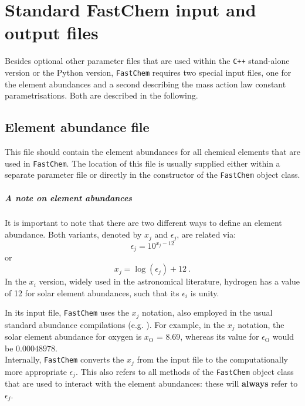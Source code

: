 \documentclass[numbers=noenddot]{aux/fcmanual}
\newcommand{\fc}{\texttt{FastChem}\xspace}
\newcommand{\cpp}{\ttt{C++}\xspace}
\newcommand{\ttt}[1]{\texttt {#1}}
\begin{document}
\chapter{Standard FastChem input and output files}
\label{sec:fastchem_input_files}

Besides optional other parameter files that are used within the \cpp stand-alone version or the Python version, \fc requires two special input files, one for the element abundances and a second describing the mass action law constant parametrisations. Both are described in the following.

\section{Element abundance file}

This file should contain the element abundances for all chemical elements that are used in \fc. The location of this file is usually supplied either within a separate parameter file or directly in the constructor of the \fc object class.

\paragraph{A note on element abundances}
It is important to note that there are two different ways to define an element abundance. Both variants, denoted by $x_j$ and $\epsilon_j$, are related via:
\begin{equation}
\epsilon_j = 10^{x_j - 12}
\end{equation}
or
\begin{equation}
 x_j = \log\left(\epsilon_j\right) + 12 \ .
\end{equation}
In the $x_i$ version, widely used in the astronomical literature, hydrogen has a value of 12 for solar element abundances, such that its $\epsilon_i$ is unity. 

In its input file, \fc uses the $x_j$ notation, also employed in the usual standard abundance compilations (e.g. \citet{Asplund2009ARA&A..47..481A}). For example, in the $x_j$ notation, the solar element abundance for oxygen is $x_\mathrm{O}$ = 8.69, whereas its value for $\epsilon_\mathrm{O}$ would be $0.00048978$.\\

Internally, \fc converts the $x_j$ from the input file to the computationally more appropriate $\epsilon_j$. This also refers to all methods of the \fc object class that are used to interact with the element abundances: these will \textbf{always} refer to $\epsilon_j$. 
\end{document}
